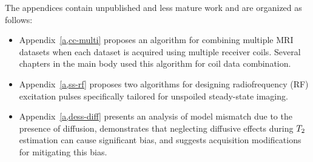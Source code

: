 \vspace{0.5em}
The appendices contain unpublished and less mature work
and are organized as follows:
\begin{itemize}
	\setlength\itemsep{0.5em}
	\item{%
		Appendix~\ref{a,cc-multi} proposes an algorithm
		for combining multiple MRI datasets
		when each dataset is acquired 
		using multiple receiver coils.
		Several chapters in the main body 
		used this algorithm for coil data combination.
	}%
	\item{%
		Appendix~\ref{a,ss-rf} proposes two algorithms
		for designing radiofrequency (RF) excitation pulses
		specifically tailored for unspoiled steady-state imaging.
	}%
	\item{%
		Appendix~\ref{a,dess-diff} presents an analysis
		of model mismatch due to the presence of diffusion,
		demonstrates that neglecting diffusive effects
		during $T_2$ estimation 
		can cause significant bias,
		and suggests acquisition modifications
		for mitigating this bias.
	}%
\end{itemize}
